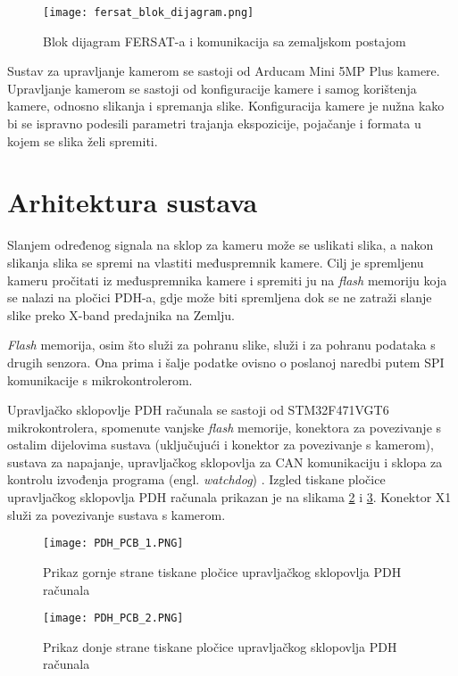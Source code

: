 \begin{figure}[H]
	\centering
	\texttt{[image: fersat\_blok\_dijagram.png]}
	\caption{Blok dijagram FERSAT-a i komunikacija sa zemaljskom postajom \cite{diplomski_goran_petrak}}
	\label{fig:fersat_blok}
\end{figure}

Sustav za upravljanje kamerom se sastoji od Arducam Mini 5MP Plus kamere. Upravljanje kamerom se sastoji od konfiguracije kamere i samog korištenja kamere, odnosno slikanja i spremanja slike. Konfiguracija kamere je nužna kako bi se ispravno podesili parametri trajanja ekspozicije, pojačanje i formata u kojem se slika želi spremiti.

\section{Arhitektura sustava}

Slanjem određenog signala na sklop za kameru može se uslikati slika, a nakon slikanja slika se spremi na vlastiti međuspremnik kamere. Cilj je spremljenu kameru pročitati iz međuspremnika kamere i spremiti ju na \textit{flash} memoriju koja se nalazi na pločici PDH-a, gdje može biti spremljena dok se ne zatraži slanje slike preko X-band predajnika na Zemlju.

\textit{Flash} memorija, osim što služi za pohranu slike, služi i za pohranu podataka s drugih senzora. Ona prima i šalje podatke ovisno o poslanoj naredbi putem SPI komunikacije s mikrokontrolerom.

Upravljačko sklopovlje PDH računala se sastoji od STM32F471VGT6 mikrokontrolera, spomenute vanjske \textit{flash} memorije, konektora za povezivanje s ostalim dijelovima sustava (uključujući i konektor za povezivanje s kamerom), sustava za napajanje, upravljačkog sklopovlja za CAN komunikaciju i sklopa za kontrolu izvođenja programa (engl. \textit{watchdog}) \cite{zavrsni_filip_juric}. Izgled tiskane pločice upravljačkog sklopovlja PDH računala prikazan je na slikama \ref{fig:PDH_PCB_1} i \ref{fig:PDH_PCB_2}. Konektor X1 služi za povezivanje sustava s kamerom.

\begin{figure}[H]
	\centering
	\texttt{[image: PDH\_PCB\_1.PNG]}
	\caption{Prikaz gornje strane tiskane pločice upravljačkog sklopovlja PDH računala \cite{zavrsni_filip_juric}}
	\label{fig:PDH_PCB_1}
\end{figure}

\begin{figure}[H]
	\centering
	\texttt{[image: PDH\_PCB\_2.PNG]}
	\caption{Prikaz donje strane tiskane pločice upravljačkog sklopovlja PDH računala \cite{zavrsni_filip_juric}}
	\label{fig:PDH_PCB_2}
\end{figure}

